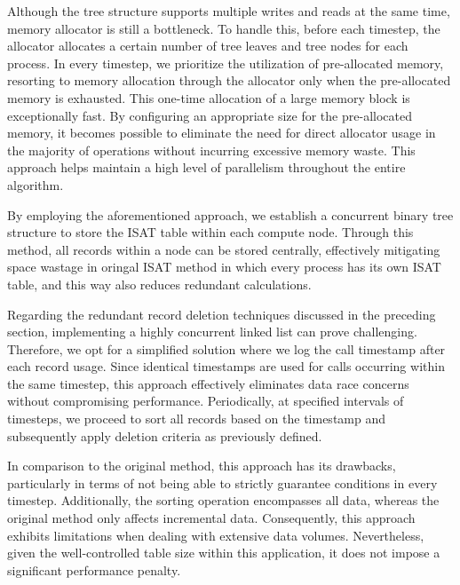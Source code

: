 Although the tree structure supports multiple writes and reads at the same time, memory allocator is still a bottleneck. To handle this, before each timestep, the allocator allocates a certain number of tree leaves and tree nodes for each process. In every timestep, we prioritize the utilization of pre-allocated memory, resorting to memory allocation through the allocator only when the pre-allocated memory is exhausted. This one-time allocation of a large memory block is exceptionally fast. By configuring an appropriate size for the pre-allocated memory, it becomes possible to eliminate the need for direct allocator usage in the majority of operations without incurring excessive memory waste. This approach helps maintain a high level of parallelism throughout the entire algorithm.


By employing the aforementioned approach, we establish a concurrent binary tree structure to store the ISAT table within each compute node. Through this method, all records within a node can be stored centrally, effectively mitigating space wastage in oringal ISAT method in which every process has its own ISAT table, and this way also reduces redundant calculations.


Regarding the redundant record deletion techniques discussed in the preceding section, implementing a highly concurrent linked list can prove challenging. Therefore, we opt for a simplified solution where we log the call timestamp after each record usage. Since identical timestamps are used for calls occurring within the same timestep, this approach effectively eliminates data race concerns without compromising performance. Periodically, at specified intervals of timesteps, we proceed to sort all records based on the timestamp and subsequently apply deletion criteria as previously defined.

In comparison to the original method, this approach has its drawbacks, particularly in terms of not being able to strictly guarantee conditions in every timestep. Additionally, the sorting operation encompasses all data, whereas the original method only affects incremental data. Consequently, this approach exhibits limitations when dealing with extensive data volumes. Nevertheless, given the well-controlled table size within this application, it does not impose a significant performance penalty.

